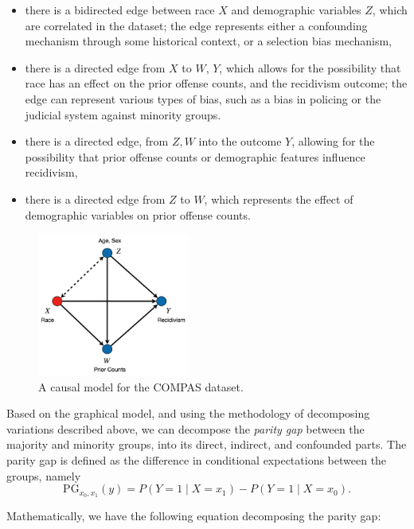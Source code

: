 \documentclass{article}
\providecommand{\tightlist}{%
  \setlength{\itemsep}{0pt}\setlength{\parskip}{0pt}}
\begin{document}
\begin{itemize}
\tightlist
\item
  there is a bidirected edge between race \(X\) and demographic
  variables \(Z\), which are correlated in the dataset; the edge
  represents either a confounding mechanism through some historical
  context, or a selection bias mechanism,
\item
  there is a directed edge from \(X\) to \(W\), \(Y\), which allows for
  the possibility that race has an effect on the prior offense counts,
  and the recidivism outcome; the edge can represent various types of
  bias, such as a bias in policing or the judicial system against
  minority groups.
\item
  there is a directed edge, from \(Z, W\) into the outcome \(Y\),
  allowing for the possibility that prior offense counts or demographic
  features influence recidivism,
\item
  there is a directed edge from \(Z\) to \(W\), which represents the
  effect of demographic variables on prior offense counts.
\end{itemize}

\begin{figure}
\centering
\includegraphics[width=5cm]{compas-sfm}
\caption{A causal model for the COMPAS dataset.}
\label{fig:compas-sfm}
\end{figure}

Based on the graphical model, and using the methodology of decomposing
variations described above, we can decompose the \emph{parity gap}
between the majority and minority groups, into its direct, indirect, and
confounded parts. The parity gap is defined as the difference in
conditional expectations between the groups, namely \begin{equation}
  \text{PG}_{x_0, x_1}(y) = P(Y = 1\mid X = x_1) - P(Y = 1 \mid X = x_0).
\end{equation}

Mathematically, we have the following equation decomposing the parity
gap:
\end{document}
